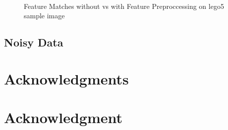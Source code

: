 \documentclass[conference,compsoc]{IEEEtran}
\begin{document}
\begin{figure}[ht!]
    \centering
    \\
    \caption{Feature Matches without vs with Feature Preproccessing 
    on lego5 sample image}
\end{figure}
\subsection{Noisy Data}

















\ifCLASSOPTIONcompsoc
  \section*{Acknowledgments}
\else
  \section*{Acknowledgment}
\fi







\end{document}
